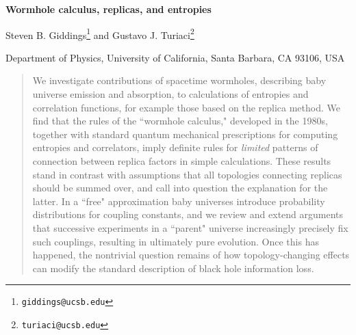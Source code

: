 \documentclass[11pt]{article}
\numberwithin{equation}{section}
\begin{document}
\thispagestyle{empty}
\begin{titlepage}
  \bigskip

  \bigskip\bigskip 




  \bigskip

\begin{center}
{\Large \bf {Wormhole calculus, replicas, and entropies }}
    \bigskip
\bigskip
\end{center}


  \begin{center}


 \rm {Steven B. Giddings\footnote{\texttt{giddings@ucsb.edu}} and Gustavo J. Turiaci\footnote{\texttt{turiaci@ucsb.edu}}}
  \bigskip \rm
\bigskip

{Department of Physics, University of California, Santa Barbara, CA 93106, USA}  \\
\rm

  \bigskip \rm
\bigskip
 
\rm


\bigskip
\bigskip



  \end{center}

   

\vspace{3cm}
  \begin{abstract}

We investigate contributions of spacetime wormholes, describing baby universe emission and absorption, to calculations of entropies and correlation functions, for example those based on the replica method.  We find that the rules of the ``wormhole calculus," developed in the 1980s, together with standard quantum mechanical prescriptions for computing entropies and correlators, imply definite rules for {\it limited} patterns of connection between replica factors in simple calculations.  These results stand in contrast with assumptions that all topologies connecting replicas should be summed over, and call into question the explanation for the latter. In a ``free" approximation baby universes introduce probability distributions for coupling constants, and we review and extend arguments that successive experiments in a ``parent" universe increasingly precisely fix such couplings, resulting in ultimately pure evolution.  Once this has happened, the nontrivial question remains of how topology-changing effects can modify the standard description of black hole information loss.
  

 \medskip
  \noindent
  \end{abstract}
\bigskip \bigskip \bigskip 

  \end{titlepage}
\end{document}
